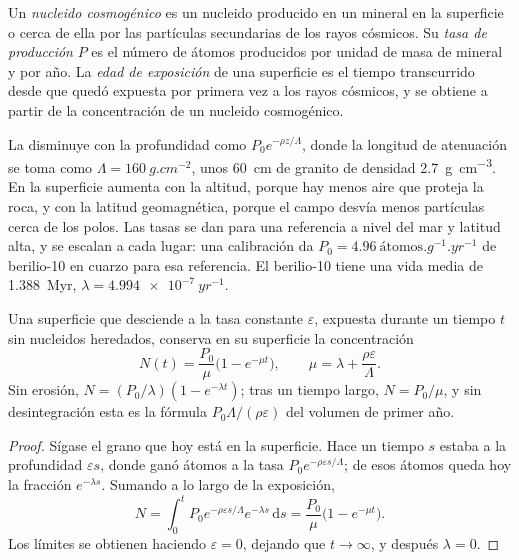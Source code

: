 \begin{definition}
\label{def:b3:advanced-geochronology:cosmogenic}
Un \emph{nucleido cosmogénico} es un nucleido producido
en un mineral en la superficie o cerca de ella por las partículas secundarias de los rayos cósmicos. Su
\emph{tasa de producción} $P$ es el número
de átomos producidos por unidad de masa de mineral y por año. La \emph{edad de
exposición} de una superficie es el tiempo transcurrido desde que quedó
expuesta por primera vez a los rayos cósmicos, y se obtiene a partir de la concentración de un nucleido cosmogénico.
\end{definition}

La  disminuye con la profundidad como $P_0e^{-\rho z/\Lambda}$, donde
la longitud de atenuación se toma como $\Lambda = \qty{160}{g.cm^{-2}}$, unos
\qty{60}{cm} de granito de densidad \qty{2.7}{g.cm^{-3}}. En la superficie aumenta con la altitud,
porque hay menos aire que proteja la roca, y con la latitud geomagnética,
porque el campo desvía menos partículas cerca de los
polos. Las tasas se dan para una referencia a nivel del mar y latitud alta, y se escalan
a cada lugar: una calibración da $P_0 = \qty{4.96}{\text{átomos}.g^{-1}.yr^{-1}}$
de berilio-10 en cuarzo para esa referencia. El berilio-10 tiene una vida media de
\qty{1.388}{Myr}, $\lambda = \qty{4.994e-7}{yr^{-1}}$.

\begin{theorem}\label{thm:b3:advanced-geochronology:exposure}
Una superficie que desciende a la tasa constante $\varepsilon$, expuesta durante un tiempo $t$
sin nucleidos heredados, conserva en su superficie la concentración
\[
N(t) = \frac{P_0}{\mu}\bigl(1 - e^{-\mu t}\bigr), \qquad
\mu = \lambda + \frac{\rho\varepsilon}{\Lambda}.
\]
Sin erosión, $N = (P_0/\lambda)(1 - e^{-\lambda t})$; tras un tiempo largo,
$N = P_0/\mu$, y sin desintegración esta es la fórmula $P_0\Lambda/(\rho\varepsilon)$
del volumen de primer año.
\end{theorem}

\begin{proof}
Sígase el grano que hoy está en la superficie. Hace un tiempo $s$ estaba a la
profundidad $\varepsilon s$, donde ganó átomos a la tasa $P_0e^{-\rho\varepsilon
s/\Lambda}$; de esos átomos queda hoy la fracción $e^{-\lambda s}$. Sumando
a lo largo de la exposición,
\[
N = \int_0^t P_0e^{-\rho\varepsilon s/\Lambda}e^{-\lambda s}\,\mathrm ds
= \frac{P_0}{\mu}\bigl(1 - e^{-\mu t}\bigr).
\]
Los límites se obtienen haciendo $\varepsilon = 0$, dejando que $t \to \infty$, y
después $\lambda = 0$.
\end{proof}

